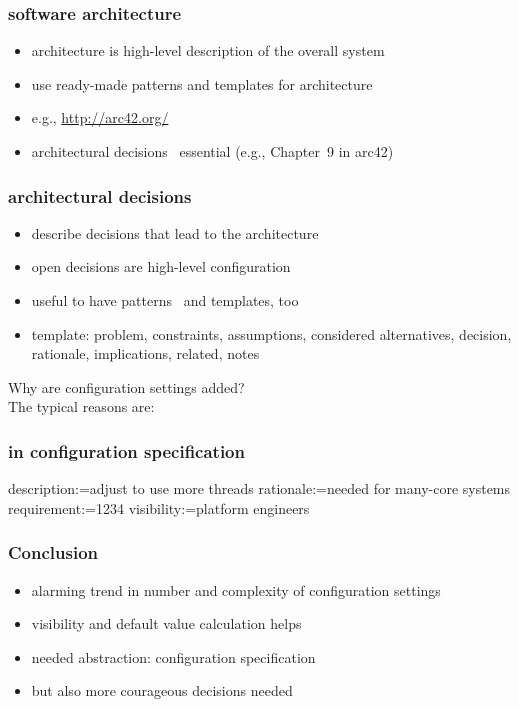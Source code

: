 \begin{frame}
	\frametitle{software architecture}
	\begin{itemize}
	\item architecture is high-level description of the overall system
	\item use ready-made patterns and templates for architecture
	\pause
	\item e.g., \url{http://arc42.org/}
	\item architectural decisions~\cite{zdun2007patterns} essential (e.g., Chapter~9 in arc42)
	\end{itemize}
\end{frame}

\begin{frame}
	\frametitle{architectural decisions}
	\begin{itemize}
	\item describe decisions that lead to the architecture
	\item open decisions are high-level configuration
	\item useful to have patterns~\cite{zdun2007patterns} and templates, too
	\item template: problem, constraints, assumptions, considered alternatives, decision, rationale, implications, related, notes
	\end{itemize}
\end{frame}

\begin{frame}
	Why are configuration settings added? \\[1cm]
	\pause
	The typical reasons are:
\end{frame}

\begin{frame}[fragile]
	\frametitle{in configuration specification}
	\begin{code}
	description:=adjust to use more threads
	rationale:=needed for many-core systems
	requirement:=1234
	visibility:=platform engineers
	\end{code}
\end{frame}

\begin{frame}
	\frametitle{Conclusion}
	\begin{itemize}
	\item alarming trend in number and complexity of configuration settings
	\item visibility and default value calculation helps
	\item needed abstraction: configuration specification
	\item but also more courageous decisions needed
	\end{itemize}
\end{frame}



\nocite{raab2017introducing}

\appendix

\begin{frame}[allowframebreaks]
	
	
\end{frame}




